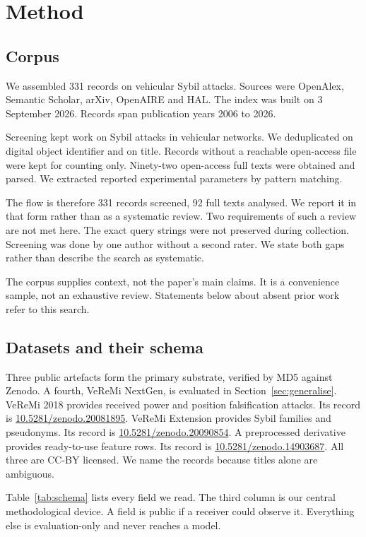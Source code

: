 \documentclass[journal,twoside]{IEEEtran}
\begin{document}
\section{Method}

\subsection{Corpus}

We assembled 331 records on vehicular Sybil attacks.
Sources were OpenAlex, Semantic Scholar, arXiv, OpenAIRE and HAL.
The index was built on 3 September 2026.
Records span publication years 2006 to 2026.

Screening kept work on Sybil attacks in vehicular networks.
We deduplicated on digital object identifier and on title.
Records without a reachable open-access file were kept for counting only.
Ninety-two open-access full texts were obtained and parsed.
We extracted reported experimental parameters by pattern matching.

The flow is therefore 331 records screened, 92 full texts analysed.
We report it in that form rather than as a systematic review.
Two requirements of such a review are not met here.
The exact query strings were not preserved during collection.
Screening was done by one author without a second rater.
We state both gaps rather than describe the search as systematic.

The corpus supplies context, not the paper's main claims.
It is a convenience sample, not an exhaustive review.
Statements below about absent prior work refer to this search.

\subsection{Datasets and their schema}

Three public artefacts form the primary substrate, verified by MD5 against Zenodo.
A fourth, VeReMi NextGen, is evaluated in Section~\ref{sec:generalise}.
VeReMi 2018 provides received power and position falsification attacks.
Its record is \url{10.5281/zenodo.20081895}.
VeReMi Extension provides Sybil families and pseudonyms.
Its record is \url{10.5281/zenodo.20090854}.
A preprocessed derivative provides ready-to-use feature rows.
Its record is \url{10.5281/zenodo.14903687}.
All three are CC-BY licensed.
We name the records because titles alone are ambiguous.

Table~\ref{tab:schema} lists every field we read.
The third column is our central methodological device.
A field is public if a receiver could observe it.
Everything else is evaluation-only and never reaches a model.
\end{document}
